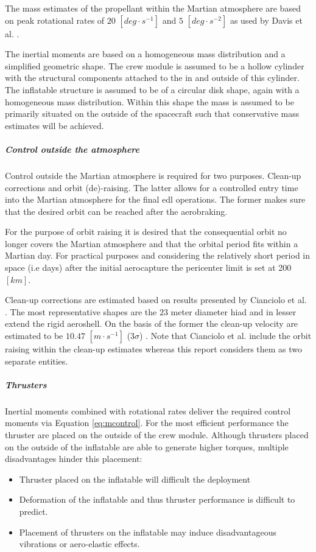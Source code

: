 The mass estimates of the propellant within the Martian atmosphere are based on peak rotational rates of $20$ $[deg\cdot s^{-1}]$ and $5$ $[deg \cdot s^{-2}]$ as used by Davis et al. \cite{Davis2010}.

The inertial moments are based on a homogeneous mass distribution and a simplified geometric shape. The crew module is assumed to be a hollow cylinder with the structural components attached to the in and outside of this cylinder. The inflatable structure is assumed to be of a circular disk shape, again with a homogeneous mass distribution. Within this shape the mass is assumed to be primarily situated on the outside of the spacecraft such that conservative mass estimates will be achieved.

\subparagraph{Control outside the atmosphere}
Control outside the Martian atmosphere is required for two purposes. Clean-up corrections and orbit (de)-raising. The latter allows for a controlled entry time into the Martian atmosphere for the final \gls{edl} operations. The former makes sure that the desired orbit can be reached after the aerobraking.

For the purpose of orbit raising it is desired that the consequential orbit no longer covers the Martian atmosphere and that the orbital period fits within a Martian day. For practical purposes and considering the relatively short period in space (i.e days) after the initial aerocapture the pericenter limit is set at 200 $[km]$. 

Clean-up corrections are estimated based on results presented by Cianciolo et al. \cite{Cianciolo2010}. The most representative shapes are the $23$ meter diameter \gls{hiad} and in lesser extend the rigid aeroshell. On the basis of the former the clean-up velocity are estimated to be $10.47$ $[m\cdot s^{-1}]$ ($3\sigma$) \cite[p.37]{Cianciolo2010}. Note that Cianciolo et al. include the orbit raising within the clean-up estimates whereas this report considers them as two separate entities.


\subparagraph{Thrusters}
Inertial moments combined with rotational rates deliver the required control moments via Equation \ref{eq:mcontrol}. For the most efficient performance the thruster are placed on the outside of the crew module. Although thrusters placed on the outside of the inflatable are able to generate higher torques, multiple disadvantages hinder this placement:
\begin{itemize}
\item Thruster placed on the inflatable will difficult the deployment
\item Deformation of the inflatable and thus thruster performance is difficult to predict.
\item Placement of thrusters on the inflatable may induce disadvantageous vibrations or aero-elastic effects.  
\end{itemize} 

